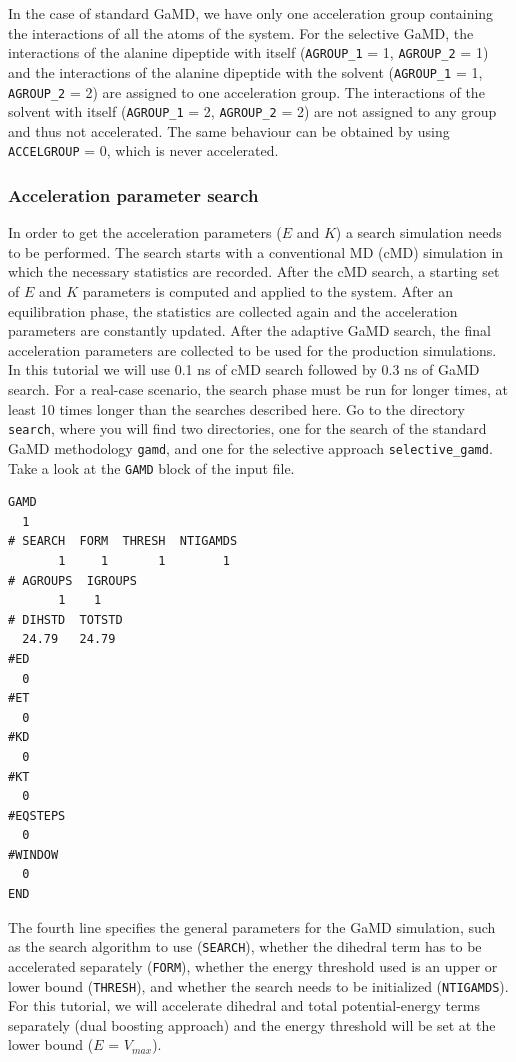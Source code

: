 In the case of standard GaMD, we have only one acceleration group containing the interactions of all the atoms of the system. For the selective GaMD, the interactions of the alanine dipeptide with itself (\texttt{AGROUP\_1} = 1, \texttt{AGROUP\_2} = 1) and the interactions of the alanine dipeptide with the solvent (\texttt{AGROUP\_1} = 1, \texttt{AGROUP\_2} = 2) are assigned to one acceleration group. The interactions of the solvent with itself (\texttt{AGROUP\_1} = 2, \texttt{AGROUP\_2} = 2) are not assigned to any group and thus not accelerated. The same behaviour can be obtained by using \texttt{ACCELGROUP} = 0, which is never accelerated.

\subsubsection{Acceleration parameter search}
In order to get the acceleration parameters ($E$ and $K$) a search simulation needs to be performed. The search starts with a conventional MD (cMD) simulation in which the necessary statistics are recorded. After the cMD search, a starting set of $E$ and $K$ parameters is computed and applied to the system. After an equilibration phase, the statistics are collected again and the acceleration parameters are constantly updated. After the adaptive GaMD search, the final acceleration parameters are collected to be used for the production simulations. In this tutorial we will use 0.1 ns of cMD search followed by 0.3 ns of GaMD search. For a real-case scenario, the search phase must be run for longer times, at least 10 times longer than the searches described here.
Go to the directory \texttt{search}, where you will find two directories, one for the search of the standard GaMD methodology \texttt{gamd}, and one for the selective approach \texttt{selective\_gamd}. Take a look at the \texttt{GAMD} block of the input file.
\begin{lstlisting}
GAMD
  1
# SEARCH  FORM  THRESH  NTIGAMDS
       1     1       1        1
# AGROUPS  IGROUPS
       1    1
# DIHSTD  TOTSTD
  24.79   24.79
#ED
  0
#ET
  0
#KD
  0
#KT
  0
#EQSTEPS
  0
#WINDOW
  0
END
\end{lstlisting}
The fourth line specifies the general parameters for the GaMD simulation, such as the search algorithm to use (\texttt{SEARCH}), whether the dihedral term has to be accelerated separately (\texttt{FORM}), whether the energy threshold used is an upper or lower bound (\texttt{THRESH}), and whether the search needs to be initialized (\texttt{NTIGAMDS}). For this tutorial, we will accelerate dihedral and total potential-energy terms separately (dual boosting approach) and the energy threshold will be set at the lower bound ($E$ = $V_{max}$). 
